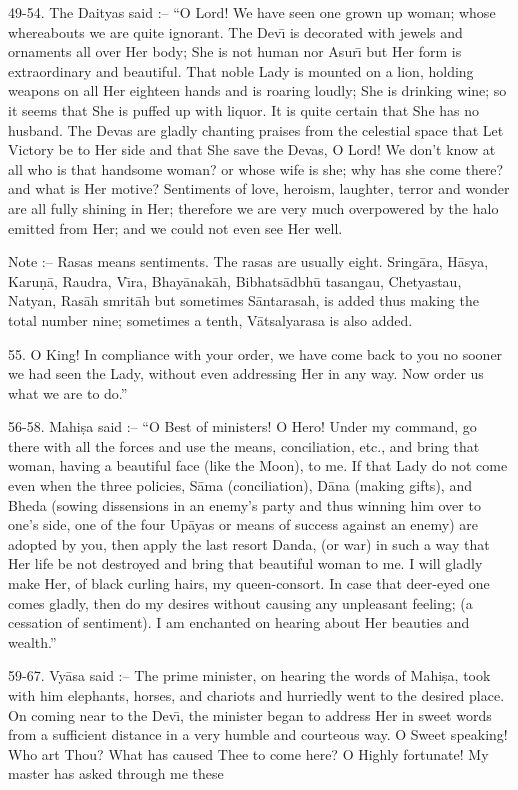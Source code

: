49-54. The Daityas said :-- ``O Lord! We have seen one grown up woman; whose whereabouts we are quite ignorant. The Dev\={\i} is decorated with jewels and ornaments all over Her body; She is not human nor Asur\={\i} but Her form is extraordinary and beautiful. That noble Lady is mounted on a lion, holding weapons on all Her eighteen hands and is roaring loudly; She is drinking wine; so it seems that She is puffed up with liquor. It is quite certain that She has no husband. The Devas are gladly chanting praises from the celestial space that Let Victory be to Her side and that She save the Devas, O Lord! We don't know at all who is that handsome woman? or whose wife is she; why has she come there? and what is Her motive? Sentiments of love, heroism, laughter, terror and wonder are all fully shining in Her; therefore we are very much overpowered by the halo emitted from Her; and we could not even see Her well.

Note :-- Rasas means sentiments. The rasas are usually eight. Sring\=ara, H\=asya, Karu\d{n}\=a, Raudra, V\={\i}ra, Bhay\=anak\=ah, Bibhats\=adbh\=u tasangau, Chetyastau, Natyan, Ras\=ah smrit\=ah but sometimes S\=antarasah, is added thus making the total number nine; sometimes a tenth, V\=atsalyarasa is also added.

55. O King! In compliance with your order, we have come back to you no sooner we had seen the Lady, without even addressing Her in any way. Now order us what we are to do.''

56-58. Mahi\d{s}a said :-- ``O Best of ministers! O Hero! Under my command, go there with all the forces and use the means, conciliation, etc., and bring that woman, having a beautiful face (like the Moon), to me. If that Lady do not come even when the three policies, S\=ama (conciliation), D\=ana (making gifts), and Bheda (sowing dissensions in an enemy's party and thus winning him over to one's side, one of the four Up\=ayas or means of success against an enemy) are adopted by you, then apply the last resort Danda, (or war) in such a way that Her life be not destroyed and bring that beautiful woman to me. I will gladly make Her, of black curling hairs, my queen-consort. In case that deer-eyed one comes gladly, then do my desires without causing any unpleasant feeling; (a cessation of sentiment). I am enchanted on hearing about Her beauties and wealth.''

59-67. Vy\=asa said :-- The prime minister, on hearing the words of Mahi\d{s}a, took with him elephants, horses, and chariots and hurriedly went to the desired place. On coming near to the Dev\={\i}, the minister began to address Her in sweet words from a sufficient distance in a very humble and courteous way. O Sweet speaking! Who art Thou? What has caused Thee to come here? O Highly fortunate! My master has asked through me these

